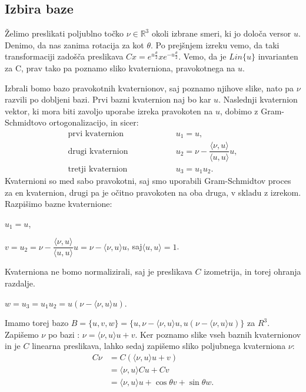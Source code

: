\documentclass[a4paper,12pt]{article}
\def\R{\mathbb{R}} %
\newcommand{\dotpr}[2]{\langle #1, #2 \rangle}
\begin{document}
\subsection{Izbira baze}

Želimo preslikati poljublno točko $\nu \in \R^3$ okoli izbrane smeri, ki jo določa versor $u$. Denimo, da nas zanima rotacija za kot $\theta$.
Po prejšnjem izreku vemo, da taki transformaciji zadošča preslikava $Cx = e^{u\frac{\theta}{2}}xe^{-u\frac{\theta}{2}}$. Vemo, da je $Lin\{u\}$ invarianten za C, prav tako pa poznamo sliko kvaterniona,
pravokotnega na $u$.

Izbrali bomo bazo pravokotnih kvaternionov, saj poznamo njihove slike, nato pa $\nu$ razvili po dobljeni bazi. Prvi bazni kvaternion naj bo kar $u$. Naslednji kvaternion vektor, ki mora biti zavoljo uporabe izreka pravokoten na $u$, dobimo z Gram-Schmidtovo ortogonalizacijo, in sicer:
\begin{align*}
   \text{prvi kvaternion} &\hspace{5em}  u_{1} = u,\\
   \text{drugi kvaternion} &\hspace{5em}   u_{2} = \nu - \dfrac{\dotpr{\nu}{u}}{\dotpr{u}{u}} u,\\
   \text{tretji kvaternion} &\hspace{5em} u_{3} = u_{1} u_{2}.
\end{align*}
Kvaternioni so med sabo pravokotni, saj smo uporabili Gram-Schmidtov proces za en kvaternion, drugi pa je očitno pravokoten na oba druga, v skladu z izrekom. Razpišimo bazne kvaternione:

\begin{center}
   $u_{1} = u$,

   $v = u_{2} = \nu - \dfrac{\dotpr{\nu}{u}}{\dotpr{u}{u}}u = \nu - \dotpr{\nu}{u}u$, saj$\dotpr{u}{u} = 1$.
\end{center}
Kvaterniona ne bomo normalizirali, saj je preslikava $C$ izometrija, in torej ohranja razdalje.

\begin{center}
   $w = u_{3} = u_{1} u_{2} = u (\nu - \dotpr{\nu}{u}u)$.
\end{center}
Imamo torej bazo $B = \{u, v, w\} = \{u, \nu - \dotpr{\nu}{u}u, u(\nu - \dotpr{\nu}{u}u)\}$ za $R^3$.
Zapišemo $\nu$ po bazi : $\nu = \dotpr{\nu}{u}u + v$. Ker poznamo slike vseh baznih kvaternionov in je $C$ linearna preslikava,
lahko sedaj zapišemo sliko poljubnega kvaterniona $\nu$:
\begin{align*}
   C \nu &= C (\dotpr{\nu}{u}u + v)\\
         &= \dotpr{\nu}{u}Cu + Cv\\
         &= \dotpr{\nu}{u}u + \cos\theta v + \sin\theta w.
\end{align*}
\end{document}
